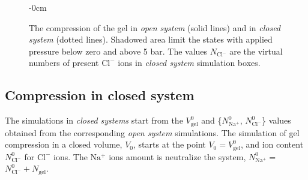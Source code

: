 \documentclass[journal,article,submit,pdftex,moreauthors]{Definitions/mdpi}
\newcommand{\ncl}{n_\mathrm{Cl^-}}
\newcommand{\Nna}{N_\mathrm{Na^+}}
\newcommand{\Ncl}{N_\mathrm{Cl^-}}
\newcommand{\cl}{\mathrm{Cl^-}}
\newcommand{\na}{\mathrm{Na^+}}
\newcommand{\Vgel}{V_\mathrm{gel}}
\newcommand{\Ngel}{N_\mathrm{gel}}
\newcommand{\Vbox}{V_0}
\begin{document}
\begin{figure}[h]
\begin{adjustwidth}{-\extralength}{0cm}
\hspace{0.02\textwidth}
\caption{The compression of the gel in \emph{open system} (solid lines) and in \emph{closed system} (dotted lines). 
Shadowed area limit the states with applied pressure below zero and above 5 bar.
The values $N_\cl$ are the virtual numbers of present $\cl$ ions in \emph{closed system} simulation boxes.
\label{fig: NV and CN}}
\end{adjustwidth}
\end{figure}


\subsection{Compression in closed system}
The simulations in \emph{closed systems} start from the $\Vgel^0$ and \{$\Nna^0$, $\Ncl^0$\} values
obtained from the corresponding \emph{open system} simulations.
The simulation of gel compression in a closed volume, $\Vbox$, starts at the point $\Vbox = \Vgel^0$,
and ion content $\Ncl^0$ for $\cl$ ions. The $\na$ ions amount is neutralize the system, $\Nna^0 = $$\Ncl^0 + \Ngel$.
\end{document}
